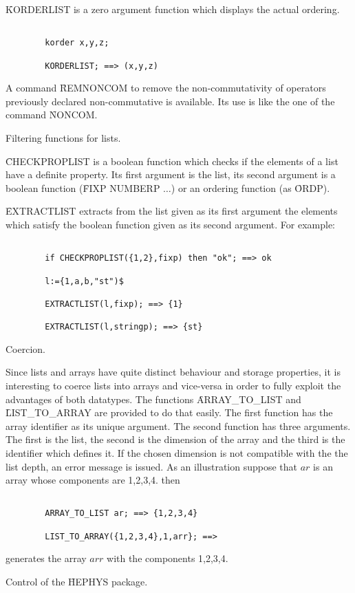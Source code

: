 \f{KORDERLIST} is a zero argument function which displays the actual
ordering.
\begin{verbatim}

        korder x,y,z;

        KORDERLIST; ==> (x,y,z)

\end{verbatim}

\item[iv.] A command \f{REMNONCOM} to remove the non-commutativity of 
operators previously declared non-commutative is available. Its use is like 
the one of the command \f{NONCOM}.

\item[v.] Filtering functions for lists.

\f{CHECKPROPLIST}  is a  boolean function which checks if the
elements of a list have a definite property. Its first argument
is the list, its second argument is a boolean function
(\f{FIXP NUMBERP $\ldots$}) or an ordering function (as \f{ORDP}).

\f{EXTRACTLIST} extracts from the list given as its first argument
the elements which satisfy the boolean function given as its second
argument. For example:
\begin{verbatim}

        if CHECKPROPLIST({1,2},fixp) then "ok"; ==> ok

        l:={1,a,b,"st")$

        EXTRACTLIST(l,fixp); ==> {1}

        EXTRACTLIST(l,stringp); ==> {st}

\end{verbatim}
\item[vi.] Coercion.

Since lists and arrays have quite distinct behaviour and storage properties,  
it is interesting to coerce lists into arrays and vice-versa in order to 
fully exploit the advantages of both datatypes. The functions  
\f{ARRAY\_TO\_LIST} and \f{LIST\_TO\_ARRAY} are provided to do that easily.
The first function has the array identifier as its unique argument. 
The second
function has three arguments. The first is the list, the second is the 
dimension of the array and the third is the identifier which defines it.  
If the chosen dimension is not compatible with the
the list depth, an error message is issued.  
As an illustration suppose that $ar$ is an array whose components are  
1,2,3,4. then
\begin{verbatim}

        ARRAY_TO_LIST ar; ==> {1,2,3,4}

        LIST_TO_ARRAY({1,2,3,4},1,arr}; ==> 

\end{verbatim}
generates the array $arr$ with the components 1,2,3,4.
\item[vii.] Control of the \f{HEPHYS} package.  

